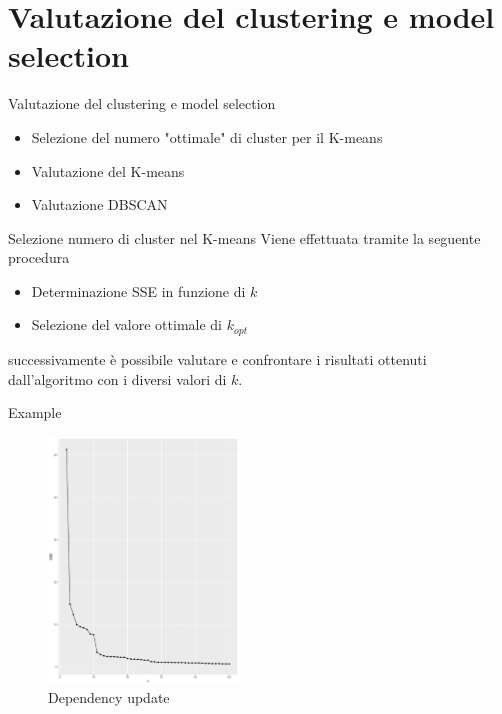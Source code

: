 \documentclass{beamer}
\begin{document}
\section{Valutazione del clustering e model selection}

\begin{frame}{Valutazione del clustering e model selection} 
    \begin{itemize}
      \item Selezione del numero "ottimale" di cluster per il K-means
      \item Valutazione del K-means
      \item Valutazione DBSCAN
    \end{itemize} 
\end{frame}

\begin{frame}{Selezione numero di cluster nel K-means} 
    Viene effettuata tramite la seguente procedura
    \begin{itemize}
      \item Determinazione SSE in funzione di $k$
      \item Selezione del valore ottimale di $k_{opt}$ 
    \end{itemize} 
    successivamente è possibile valutare e confrontare i risultati ottenuti dall'algoritmo
    con i diversi valori di $k$.
\end{frame}

\begin{frame}{Example}
    \begin{figure}[bt]
      \begin{center}
      \includegraphics[width = 0.45\textwidth]{../img/k-sse-crediti-totali-arc-prg.pdf}
      \caption{Dependency update}
      \end{center}
    \end{figure}
\end{frame}
\end{document}
